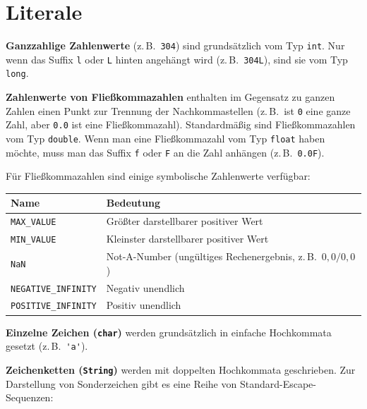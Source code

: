 \section{Literale}

\begin{description}
\item{\textbf{Ganzzahlige Zahlenwerte}} (z.\,B.\ \lstinline|304|) sind
grundsätzlich vom Typ \lstinline|int|. Nur wenn das Suffix \lstinline|l| oder \lstinline|L| hinten
angehängt wird (z.\,B.\ \lstinline|304L|), sind sie vom Typ \lstinline|long|.

\item{\textbf{Zahlenwerte von Fließkommazahlen}} enthalten im Gegensatz zu
ganzen Zahlen einen Punkt zur Trennung der Nachkommastellen (z.\,B.\ ist \lstinline|0| eine ganze Zahl,
aber \lstinline|0.0| ist eine Fließkommazahl). Standardmäßig sind
Fließkommazahlen vom Typ \lstinline|double|. Wenn man eine Fließkommazahl vom
Typ \lstinline|float| haben möchte, muss man das Suffix \lstinline|f| oder
\lstinline|F| an die Zahl anhängen (z.\,B.\ \lstinline|0.0F|).

Für Fließkommazahlen sind einige symbolische Zahlenwerte verfügbar:

\begin{tabular}{|l|l|}\hline
\textbf{Name} & \textbf{Bedeutung} \\ \hline
{\lstinline|MAX_VALUE|} & Größter darstellbarer positiver Wert \\ \hline
{\lstinline|MIN_VALUE|} & Kleinster darstellbarer positiver Wert \\ \hline
{\lstinline|NaN|} & Not-A-Number (ungültiges Rechenergebnis, z.\,B.\ $0{,}0 / 0{,}0$) \\ \hline
{\lstinline|NEGATIVE_INFINITY|} & Negativ unendlich \\ \hline
{\lstinline|POSITIVE_INFINITY|} & Positiv unendlich \\ \hline
\end{tabular}

\item{\textbf{Einzelne Zeichen (\lstinline|char|)}} werden grundsätzlich in einfache
Hochkommata gesetzt (z.\,B.\ \lstinline|'a'|).

\item{\textbf{Zeichenketten (\lstinline|String|)}} werden mit doppelten
Hochkommata geschrieben. Zur Darstellung von Sonderzeichen gibt es eine Reihe
von Standard-Escape-Sequenzen:


\end{description}
